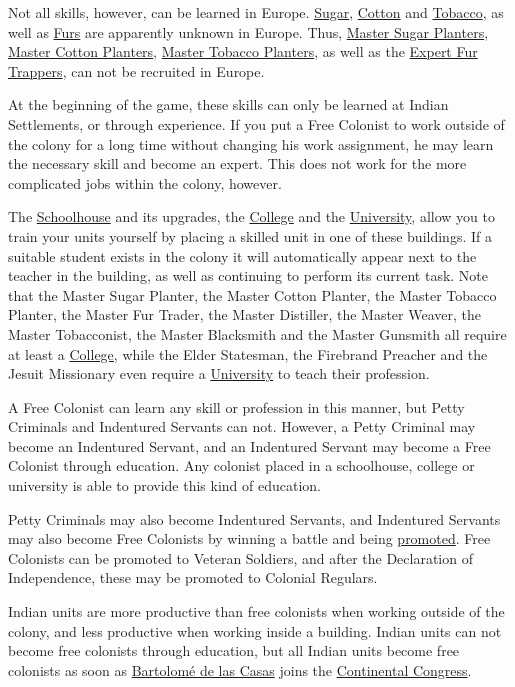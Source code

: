 \documentclass[12pt]{book}
\begin{document}
Not all skills, however, can be learned in Europe.
\hyperlink{Sugar}{Sugar}, \hyperlink{Cotton}{Cotton} and
\hyperlink{Tobacco}{Tobacco}, as well as \hyperlink{Furs}{Furs} are
apparently unknown in Europe. Thus, \hyperlink{Master Sugar
Planter}{Master Sugar Planters}, \hyperlink{Master Cotton
Planter}{Master Cotton Planters}, \hyperlink{Master Tobacco
Planter}{Master Tobacco Planters}, as well as the \hyperlink{Expert
Fur Trapper}{Expert Fur Trappers}, can not be recruited in Europe.

At the beginning of the game, these skills can only be learned at
Indian Settlements, or through experience. If you put a Free Colonist
to work outside of the colony for a long time without changing his
work assignment, he may learn the necessary skill and become an
expert. This does not work for the more complicated jobs within the
colony, however. 

The \hyperlink{Schoolhouse}{Schoolhouse} and its upgrades, the
\hyperlink{College}{College} and the
\hyperlink{University}{University}, allow you to train your units
yourself by placing a skilled unit in one of these buildings.  If a
suitable student exists in the colony it will automatically appear
next to the teacher in the building, as well as continuing to perform
its current task.  Note that the Master Sugar Planter, the Master
Cotton Planter, the Master Tobacco Planter, the Master Fur Trader,
the Master Distiller, the Master Weaver, the Master Tobacconist, the
Master Blacksmith and the Master Gunsmith all require at least a
\hyperlink{College}{College}, while the Elder Statesman, the Firebrand
Preacher and the Jesuit Missionary even require a
\hyperlink{University}{University} to teach their profession.

A Free Colonist can learn any skill or profession in this manner, but
Petty Criminals and Indentured Servants can not.  However, a Petty
Criminal may become an Indentured Servant, and an Indentured Servant
may become a Free Colonist through education. Any colonist placed in a
schoolhouse, college or university is able to provide this kind of
education.

Petty Criminals may also become Indentured Servants, and Indentured
Servants may also become Free Colonists by winning a battle and being
\hyperlink{promotion}{promoted}. Free Colonists can be promoted to
Veteran Soldiers, and after the Declaration of Independence, these may
be promoted to Colonial Regulars.

Indian units are more productive than free colonists when working
outside of the colony, and less productive when working inside a
building. Indian units can not become free colonists through
education, but all Indian units become free colonists as soon as
\hyperlink{Bartolome de las Casas}{Bartolom\'e de las Casas} joins
the \hyperlink{Continental Congress}{Continental Congress}.
\end{document}
